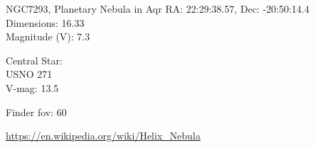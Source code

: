 \begin{block}{NGC7293, Planetary Nebula in Aqr}
    RA: 22:29:38.57, Dec: -20:50:14.4 \\ 
    Dimensions: 16.33 \\ 
    Magnitude (V): 7.3

    Central Star: \\ 
      \hspace{1em}USNO 271 \\ 
      \hspace{1em}V-mag: 13.5 


    Finder fov: 60 

    \url{https://en.wikipedia.org/wiki/Helix_Nebula} 
\end{block}